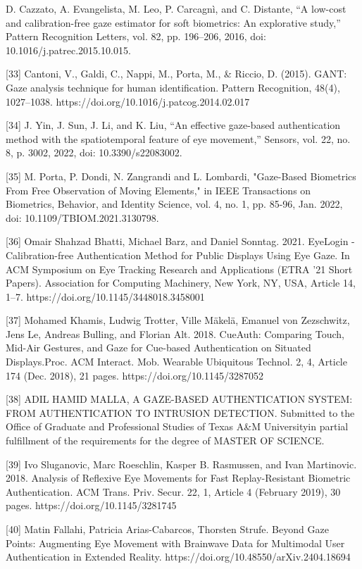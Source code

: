 \documentclass{article}
\begin{document}
\begin{raggedright}
[32] D. Cazzato, A. Evangelista, M. Leo, P. Carcagnì, and C. Distante, “A low-cost and calibration-free gaze estimator for soft biometrics: An explorative study,” Pattern Recognition Letters, vol. 82, pp. 196–206, 2016, doi: 10.1016/j.patrec.2015.10.015.

[33] Cantoni, V., Galdi, C., Nappi, M., Porta, M., \& Riccio, D. (2015). GANT: Gaze analysis technique for human identification. Pattern Recognition, 48(4), 1027–1038. https://doi.org/10.1016/j.patcog.2014.02.017

[34] J. Yin, J. Sun, J. Li, and K. Liu, “An effective gaze-based authentication method with the spatiotemporal feature of eye movement,” Sensors, vol. 22, no. 8, p. 3002, 2022, doi: 10.3390/s22083002.

[35] M. Porta, P. Dondi, N. Zangrandi and L. Lombardi, "Gaze-Based Biometrics From Free Observation of Moving Elements," in IEEE Transactions on Biometrics, Behavior, and Identity Science, vol. 4, no. 1, pp. 85-96, Jan. 2022, doi: 10.1109/TBIOM.2021.3130798.

[36] Omair Shahzad Bhatti, Michael Barz, and Daniel Sonntag. 2021. EyeLogin - Calibration-free Authentication Method for Public Displays Using Eye Gaze. In ACM Symposium on Eye Tracking Research and Applications (ETRA '21 Short Papers). Association for Computing Machinery, New York, NY, USA, Article 14, 1–7. https://doi.org/10.1145/3448018.3458001

[37] Mohamed Khamis, Ludwig Trotter, Ville Mäkelä, Emanuel von Zezschwitz, Jens Le, Andreas Bulling, and Florian Alt. 2018. CueAuth: Comparing Touch, Mid-Air Gestures, and Gaze for Cue-based Authentication on Situated Displays.Proc. ACM Interact. Mob. Wearable Ubiquitous Technol. 2, 4, Article 174 (Dec. 2018), 21 pages. https://doi.org/10.1145/3287052

[38] ADIL HAMID MALLA, A GAZE-BASED AUTHENTICATION SYSTEM: FROM AUTHENTICATION TO INTRUSION DETECTION. Submitted to the Office of Graduate and Professional Studies of Texas A\&M Universityin partial fulfillment of the requirements for the degree of MASTER OF SCIENCE.

[39] Ivo Sluganovic, Marc Roeschlin, Kasper B. Rasmussen, and Ivan Martinovic. 2018. Analysis of Reflexive Eye Movements for Fast Replay-Resistant Biometric Authentication. ACM Trans. Priv. Secur. 22, 1, Article 4 (February 2019), 30 pages. https://doi.org/10.1145/3281745

[40] Matin Fallahi, Patricia Arias-Cabarcos, Thorsten Strufe. Beyond Gaze Points: Augmenting Eye Movement with Brainwave Data for Multimodal User Authentication in Extended Reality. https://doi.org/10.48550/arXiv.2404.18694


\end{raggedright}
\end{document}
